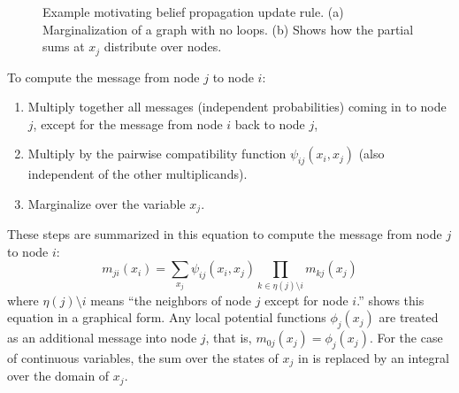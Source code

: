 \begin{figure}
{{}
}
\caption{Example motivating belief propagation update rule. (a)
  Marginalization of a graph with no loops.  (b) Shows how the partial sums at $x_j$ distribute over nodes.} 
\label{fig:bpmotivator2}
\end{figure}


To compute the message from node $j$ to node $i$:
\begin{enumerate}
\item Multiply together all messages (independent probabilities) coming in to node $j$, except for
 the message from node $i$ back to node $j$,
\item Multiply by the pairwise compatibility function $\psi_{ij}(x_i, x_j)$ (also independent of the other multiplicands).
\item Marginalize over the variable $x_j$.
\end{enumerate}
These steps are summarized in this equation to compute the message from node $j$ to node $i$:
\begin{equation} 
m_{ji}(x_i) = \sum_{x_j} \psi_{ij} (x_i, x_j) 
\prod_{k\in \eta(j) \mbox{\textbackslash}   i} m_{kj}(x_j)
\label{eq:bpupdate}
\end{equation} 
where $\eta(j) \mbox{\textbackslash}   i$ means ``the neighbors of
node $j$ except for node $i$.''  \Fig{\ref{fig:bpdiscrete}} shows this
equation in a graphical form.  Any local potential functions
$\phi_{j}(x_j)$ are treated as an additional message into node $j$, that is, $m_{0j}(x_j) = \phi_{j}(x_j)$.
For the case of continuous variables, the
sum over the states of $x_j$ in \eqn{\ref{eq:bpupdate}} is replaced by an integral over the
domain of $x_j$.

